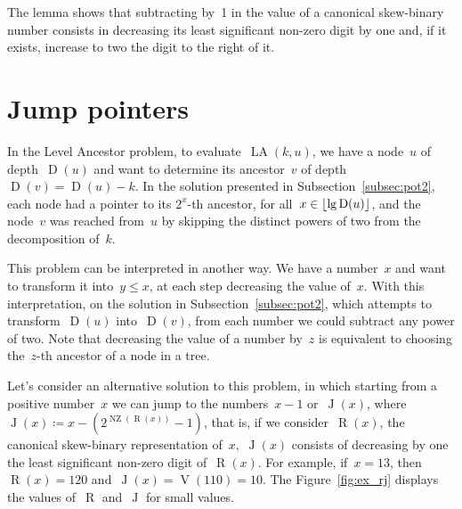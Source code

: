 \documentclass[main.tex]{subfiles}
\newcommand{\LA}{\operatorname{LA}}
\newcommand{\Dep}{\operatorname{D}}
\newcommand{\NZ}{\operatorname{NZ}}
\renewcommand{\V}{\operatorname{V}}
\newcommand{\R}{\operatorname{R}}
\newcommand{\J}{\operatorname{J}}
\begin{document}
The lemma shows that subtracting by~1 in the value of a canonical skew-binary number consists in decreasing its least significant non-zero digit by one and, if it exists, increase to two the digit to the right of it.

\section{Jump pointers}

In the Level Ancestor problem, to evaluate~$\LA(k, u)$, we have a node~$u$ of depth~$\Dep(u)$ and want to determine its ancestor~$v$ of depth~${\Dep(v) = \Dep(u) - k}$. In the solution presented in Subsection~\ref{subsec:pot2}, each node had a pointer to its $2^x$-th ancestor, for all~${x \in \floor{\lg\Dep(u)}}$, and the node~$v$ was reached from~$u$ by skipping the distinct powers of two from the decomposition of~$k$.

This problem can be interpreted in another way. We have a number~$x$ and want to transform it into~$y \leq x$, at each step decreasing the value of~$x$. With this interpretation, on the solution in Subsection~\ref{subsec:pot2}, which attempts to transform~$\Dep(u)$ into~$\Dep(v)$, from each number we could subtract any power of two. Note that decreasing the value of a number by~$z$ is equivalent to choosing the~$z$-th ancestor of a node in a tree.

Let's consider an alternative solution to this problem, in which starting from a positive number~$x$ we can jump to the numbers~$x-1$ or~$\J(x)$, where~${\J(x) \coloneqq x - (2^{\NZ(\R(x))} - 1)}$, that is, if we consider~$\R(x)$, the canonical skew-binary representation of~$x$,~$\J(x)$ consists of decreasing by one the least significant non-zero digit of~$\R(x)$. For example, if~$x = 13$, then~${\R(x) = 120}$ and~${\J(x) = \V(110) = 10}$. The Figure~\ref{fig:ex_rj} displays the values of~$\R$ and~$\J$ for small values.
\end{document}
